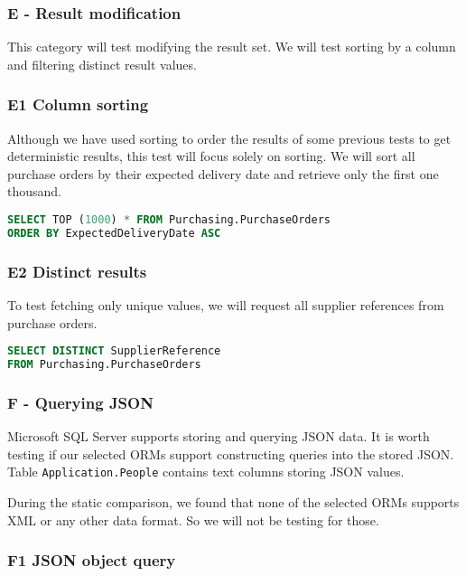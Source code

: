 \subsubsection{E - Result modification}
This category will test modifying the result set. We will test sorting by a column and filtering distinct result values.

\subsubsection*{E1 Column sorting} \label{query:e1}
Although we have used sorting to order the results of some previous tests to get deterministic results, this test will focus solely on sorting.
We will sort all purchase orders by their expected delivery date and retrieve only the first one thousand.

\begin{lstlisting}[language=SQL]
SELECT TOP (1000) * FROM Purchasing.PurchaseOrders 
ORDER BY ExpectedDeliveryDate ASC
\end{lstlisting}

\subsubsection*{E2 Distinct results} \label{query:e2}
To test fetching only unique values, we will request all supplier references from purchase orders.

\begin{lstlisting}[language=SQL]
SELECT DISTINCT SupplierReference 
FROM Purchasing.PurchaseOrders
\end{lstlisting}

\subsubsection{F - Querying JSON}
Microsoft SQL Server supports storing and querying JSON data\cite{mssqljson}. It is worth testing if our selected ORMs support constructing queries into the stored JSON.
Table \texttt{Application.People} contains text columns storing JSON values.

During the static comparison, we found that none of the selected ORMs supports XML or any other data format. So we will not be testing for those.

\subsubsection*{F1 JSON object query} \label{query:f1}

